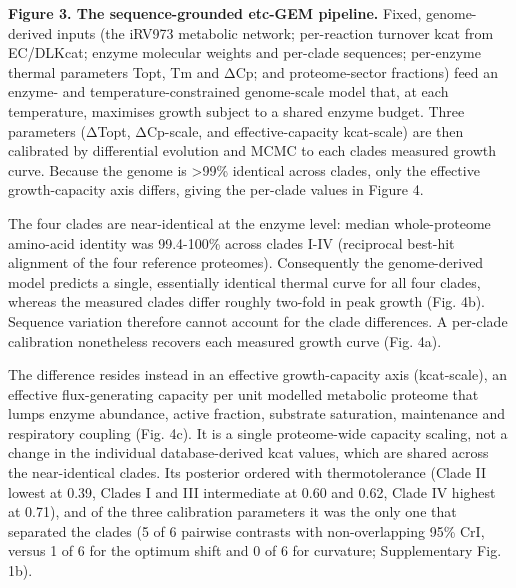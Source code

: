 \documentclass[
]{article}
\newcounter{none} %
\begin{document}
\textbf{Figure 3. The sequence-grounded etc-GEM pipeline.} Fixed,
genome-derived inputs (the iRV973 metabolic network; per-reaction
turnover kcat from EC/DLKcat; enzyme molecular weights and per-clade
sequences; per-enzyme thermal parameters Topt, Tm and ΔCp; and
proteome-sector fractions) feed an enzyme- and temperature-constrained
genome-scale model that, at each temperature, maximises growth subject
to a shared enzyme budget. Three parameters (ΔTopt, ΔCp-scale, and
effective-capacity kcat-scale) are then calibrated by differential
evolution and MCMC to each clade\textquotesingle s measured growth
curve. Because the genome is \textgreater99\% identical across clades,
only the effective growth-capacity axis differs, giving the per-clade
values in Figure 4.

The four clades are near-identical at the enzyme level: median
whole-proteome amino-acid identity was 99.4-100\% across clades I-IV
(reciprocal best-hit alignment of the four reference proteomes).
Consequently the genome-derived model predicts a single, essentially
identical thermal curve for all four clades, whereas the measured clades
differ roughly two-fold in peak growth (Fig. 4b). Sequence variation
therefore cannot account for the clade differences. A per-clade
calibration nonetheless recovers each measured growth curve (Fig. 4a).

The difference resides instead in an effective growth-capacity axis
(kcat-scale), an effective flux-generating capacity per unit modelled
metabolic proteome that lumps enzyme abundance, active fraction,
substrate saturation, maintenance and respiratory coupling (Fig. 4c). It
is a single proteome-wide capacity scaling, not a change in the
individual database-derived kcat values, which are shared across the
near-identical clades. Its posterior ordered with thermotolerance (Clade
II lowest at 0.39, Clades I and III intermediate at 0.60 and 0.62, Clade
IV highest at 0.71), and of the three calibration parameters it was the
only one that separated the clades (5 of 6 pairwise contrasts with
non-overlapping 95\% CrI, versus 1 of 6 for the optimum shift and 0 of 6
for curvature; Supplementary Fig. 1b).
\end{document}
